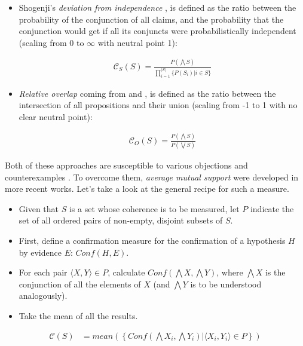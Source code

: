 \documentclass[10pt,]{scrartcl}
\begin{document}
\begin{itemize}
    \item  Shogenji's 
  \textit{deviation from independence} \citep{shogenji1999conducive}, is defined as the ratio between the probability of the
conjunction of all claims, and the probability that the conjunction
would get if all its conjuncts were probabilistically independent (scaling from 0 to $\infty$ with neutral point 1):

\begin{align}
    \tag{Shogenji}
    \label{coh:Shogenji}
     \mathcal{C}_{S}(S)=\frac{P(\bigwedge S)}{\prod_{i=1}^{\vert S \vert}\{P(S_i)\vert i \in S\}}
\end{align}

\item  \textit{Relative overlap} coming from \citep{olsson2001conducive} and \citep{glass2002}, is defined as the ratio  between the intersection of all propositions and their union (scaling from -1 to 1 with no clear neutral point):

\begin{align}
    \tag{Olsson}
    \label{coh:Olsson}
    \mathcal{C}_{O}(S)=\frac{P(\bigwedge S)}{P(\bigvee S)}
\end{align}


\end{itemize}

Both of these approaches are susceptible to various objections and counterexamples \citep{Merricks1995,shogenji1999conducive, Akiba2000Shogenjis, Shogenji2001Reply, bovens2004bayesian,Siebel2004On-Fitelsons-me,siebel2006against,Shogenji2006Why,crupi2007BayesianMeasuresEvidential, koscholke2016evaluating, Schippers2019General}. To overcome them, 
\textit{average mutual support} were developed in more recent works. Let’s take a look at  the general recipe for such a measure.


\begin{itemize}
\item
  Given that \(S\) is a set whose coherence is to be measured, let \(P\)
  indicate the set of all ordered pairs of non-empty, disjoint subsets
  of \(S\).
\item
  First, define a confirmation measure for the confirmation of a hypothesis \(H\) by evidence  \(E\): \(Conf(H,E)\).
\item
  For each pair \(\langle X, Y \rangle \in P\), calculate
  \(Conf(\bigwedge X, \bigwedge Y)\), where $\bigwedge X$  is the conjunction of all the elements of $X$ (and $\bigwedge Y$ is to be understood analogously).
\item
  Take the mean of all the results.
\end{itemize}\begin{align*}
    \mathcal{C}(S) & =
mean\left(\left\{Conf(\bigwedge X_i, \bigwedge Y_i) | \langle X_i, Y_i \rangle \in P\right\} \right)
\end{align*}
\end{document}
